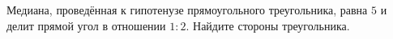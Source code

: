 \begin{ex}
	\begin{condition}
		Медиана, проведённая к гипотенузе прямоугольного треугольника, равна \( 5 \) и делит прямой угол в отношении \( 1 : 2 \). Найдите стороны треугольника.
	\end{condition}
\end{ex}